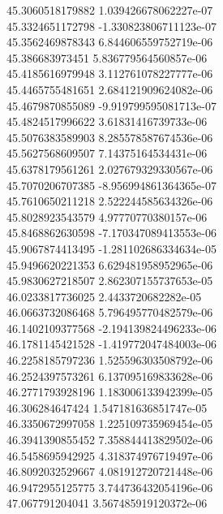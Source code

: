 {45.3060518179882 1.039426678062227e-07 \\
45.3324651172798 -1.330823806711123e-07 \\
45.3562469878343 6.844606559752719e-06 \\
45.386683973451 5.836779564560857e-06 \\
45.4185616979948 3.112761078227777e-06 \\
45.4465755481651 2.684121909624082e-06 \\
45.4679870855089 -9.919799595081713e-07 \\
45.4824517996622 3.61831416739733e-06 \\
45.5076383589903 8.285578587674536e-06 \\
45.5627568609507 7.14375164534431e-06 \\
45.6378179561261 2.027679329330567e-06 \\
45.7070206707385 -8.956994861364365e-07 \\
45.7610650211218 2.522244585634326e-06 \\
45.8028923543579 4.97770770380157e-06 \\
45.8468862630598 -7.170347089413553e-06 \\
45.9067874413495 -1.281102686334634e-05 \\
45.9496620221353 6.629481958952965e-06 \\
45.9830627218507 2.862307155737653e-05 \\
46.0233817736025 2.4433720682282e-05 \\
46.0663732086468 5.796495770482579e-06 \\
46.1402109377568 -2.194139824496233e-06 \\
46.1781145421528 -1.419772047484003e-06 \\
46.2258185797236 1.525596303508792e-06 \\
46.2524397573261 6.137095169833628e-06 \\
46.2771793928196 1.183006133942399e-05 \\
46.306284647424 1.547181636851747e-05 \\
46.3350672997058 1.225109735969454e-05 \\
46.3941390855452 7.358844413829502e-06 \\
46.5458695942925 4.318374976719497e-06 \\
46.8092032529667 4.081912720721448e-06 \\
46.9472955125775 3.744736432054196e-06 \\
47.067791204041 3.567485919120372e-06 \\
}
